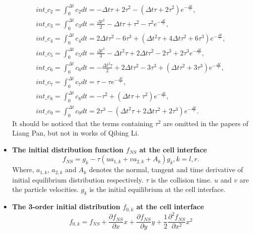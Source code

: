 \documentclass[review]{elsarticle}
\begin{document}
\begin{itemize}
\begin{equation}
\begin{gathered}
		int\_c_2=\int_{0}^{\Delta t} c_2dt
			=- \Delta{t} \tau + 2 \tau^{2} - \left(\Delta{t} \tau + 2 \tau^{2}\right) e^{- \frac{\Delta{t}}{\tau}},\\
		int\_c_3=\int_{0}^{\Delta t} c_3dt
			=\frac{\Delta{t}^{2}}{2} - \Delta{t} \tau + \tau^{2} - \tau^{2} e^{- \frac{\Delta{t}}{\tau}},\\
		int\_c_4=\int_{0}^{\Delta t} c_4dt
			=2 \Delta{t} \tau^{2} - 6 \tau^{3} + \left(\Delta{t}^{2} \tau + 4 \Delta{t} \tau^{2} 
			+ 6 \tau^{3}\right) e^{- \frac{\Delta{t}}{\tau}},\\
		int\_c_5=\int_{0}^{\Delta t} c_5dt
			=\frac{\Delta{t}^{3}}{3} - \Delta{t}^{2} \tau + 2 \Delta{t} \tau^{2} - 2 \tau^{3} 
			+ 2 \tau^{3} e^{- \frac{\Delta{t}}{\tau}},\\
		int\_c_6=\int_{0}^{\Delta t} c_6dt
			=- \frac{\Delta{t}^{2} \tau}{2} + 2 \Delta{t} \tau^{2} - 3 \tau^{3} + \left(\Delta{t} \tau^{2} 
			+ 3 \tau^{3}\right) e^{- \frac{\Delta{t}}{\tau}},\\
		int\_c_7 =\int_{0}^{\Delta t}c_7dt=\tau - \tau e^{- \frac{\Delta{t}}{\tau}}, \\
		int\_c_8=\int_{0}^{\Delta t}c_8dt=- \tau^{2} + \left(\Delta{t} \tau + \tau^{2}\right) e^{- \frac{\Delta{t}}{\tau}},\\
		int\_c_9=\int_{0}^{\Delta t}c_9dt=2 \tau^{3} - \left(\Delta{t}^{2} \tau + 2 \Delta{t} \tau^{2} 
			+ 2 \tau^{3}\right) e^{- \frac{\Delta{t}}{\tau}}.
	\end{gathered}
	\end{equation}
	{\color {red}It should be noticed that the terms containing $\tau^2$ are omitted in the papers of Liang Pan, but not in works of Qibing Li.}  
	\item \textbf{The initial distribution function $f_{NS}$ at the cell interface}
		\begin{equation}\label{fNS}
			f_{NS}=g_k-\tau(ua_{1,k}+va_{2,k}+A_k)g_k, k=l,r.
		\end{equation}
		Where, $a_{1,k}$, $a_{2,k}$ and $A_k$ denotes the normal, tangent and time derivative of initial equilibrium distribution respectively. $\tau$ is the collision time. $u$ and $v$ are the particle velocities. $g_k$ is the initial equilibrium at the 
		cell interface.
	\item \textbf{The 3-order initial distribution $f_{0,k}$ at the cell interface}
		\begin{equation}\label{f0}
			f_{0,k}=f_{NS}+\frac{\partial f_{NS}}{\partial x}x+\frac{\partial f_{NS}}{\partial y}y
			+\frac{1}{2}\frac{\partial^2 f_{NS}}{\partial x^2}x^2

\end{equation}
\end{itemize}
\end{document}
